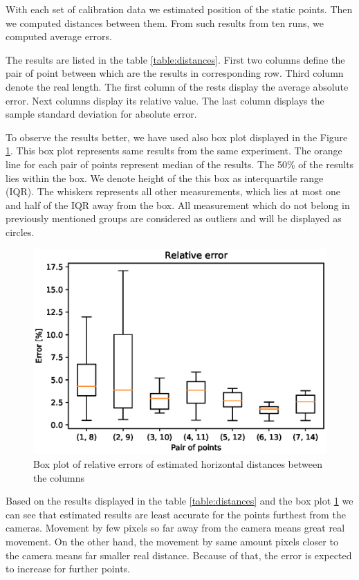 With each set of calibration data we estimated position of the static points.
Then we computed distances between them. From such results from ten runs, we
computed average errors.

The results are listed in the table \ref{table:distances}. First two columns
define the pair of point between which are the results in corresponding row.
Third column denote the real length. The first column of the rests display the
average absolute error. Next columns display its relative value. The last
column displays the sample standard deviation for absolute error. 

To observe the results better, we have used also box plot displayed in the
Figure \ref{fig:horizontal-boxplot}. This box plot represents same results from the
same experiment. The orange line for each pair of points represent median of
the results. The 50\% of the results lies within the box. We denote height of
the this box as interquartile range (IQR). The whiskers represents all other
measurements, which lies at most one and half of the IQR away from the box. All
measurement which do not belong in previously mentioned groups are considered
as outliers and  will be displayed as circles.

\begin{figure}
\includegraphics[width=\linewidth]{experiments/horizontal.eps}
\caption{Box plot of relative errors of estimated horizontal distances between the columns}
\label{fig:horizontal-boxplot}
\end{figure}

Based on the results displayed in the table \ref{table:distances} and the box
plot \ref{fig:horizontal-boxplot} we can see that estimated results are least accurate
for the points furthest from the cameras. Movement by few pixels so far away
from the camera means great real movement.  On the other hand, the
movement by same amount pixels closer to the camera means far smaller
real distance. Because of that, the error is expected to increase for
further points.

